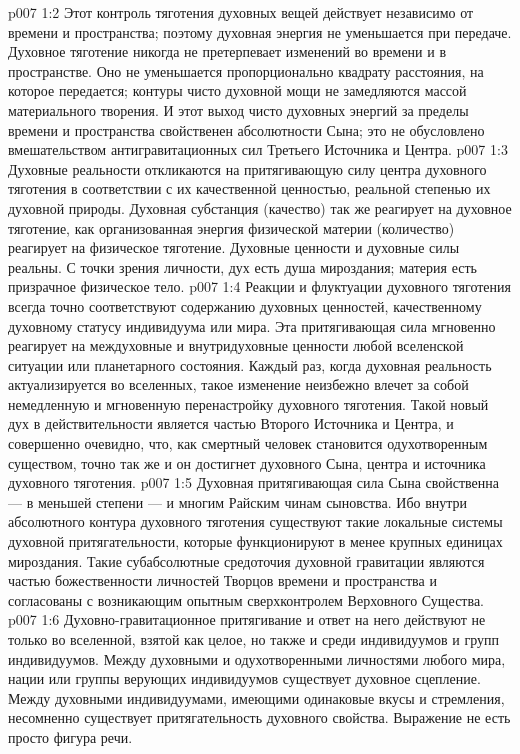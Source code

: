 \vs p007 1:2 Этот контроль тяготения духовных вещей действует независимо от времени и пространства; поэтому духовная энергия не уменьшается при передаче. Духовное тяготение никогда не претерпевает изменений во времени и в пространстве. Оно не уменьшается пропорционально квадрату расстояния, на которое передается; контуры чисто духовной мощи не замедляются массой материального творения. И этот выход чисто духовных энергий за пределы времени и пространства свойственен абсолютности Сына; это не обусловлено вмешательством антигравитационных сил Третьего Источника и Центра.
\vs p007 1:3 Духовные реальности откликаются на притягивающую силу центра духовного тяготения в соответствии с их качественной ценностью, реальной степенью их духовной природы. Духовная субстанция (качество) так же реагирует на духовное тяготение, как организованная энергия физической материи (количество) реагирует на физическое тяготение. Духовные ценности и духовные силы реальны. С точки зрения личности, дух есть душа мироздания; материя есть призрачное физическое тело.
\vs p007 1:4 Реакции и флуктуации духовного тяготения всегда точно соответствуют содержанию духовных ценностей, качественному духовному статусу индивидуума или мира. Эта притягивающая сила мгновенно реагирует на междуховные и внутридуховные ценности любой вселенской ситуации или планетарного состояния. Каждый раз, когда духовная реальность актуализируется во вселенных, такое изменение неизбежно влечет за собой немедленную и мгновенную перенастройку духовного тяготения. Такой новый дух в действительности является частью Второго Источника и Центра, и совершенно очевидно, что, как смертный человек становится одухотворенным существом, точно так же и он достигнет духовного Сына, центра и источника духовного тяготения.
\vs p007 1:5 \pc Духовная притягивающая сила Сына свойственна --- в меньшей степени --- и многим Райским чинам сыновства. Ибо внутри абсолютного контура духовного тяготения существуют такие локальные системы духовной притягательности, которые функционируют в менее крупных единицах мироздания. Такие субабсолютные средоточия духовной гравитации являются частью божественности личностей Творцов времени и пространства и согласованы с возникающим опытным сверхконтролем Верховного Существа.
\vs p007 1:6 Духовно\hyp{}гравитационное притягивание и ответ на него действуют не только во вселенной, взятой как целое, но также и среди индивидуумов и групп индивидуумов. Между духовными и одухотворенными личностями любого мира, нации или группы верующих индивидуумов существует духовное сцепление. Между духовными индивидуумами, имеющими одинаковые вкусы и стремления, несомненно существует притягательность духовного свойства. Выражение  не есть просто фигура речи.
